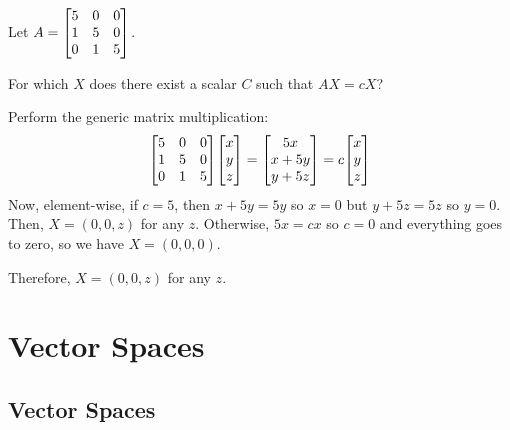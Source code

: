 \documentclass[notes]{agony}
\begin{document}
\begin{xca}
  Let $A = \mqty[5&0&0 \\ 1&5&0 \\ 0&1&5]$.

  For which $X$ does there exist a scalar $C$ such that $AX = cX$?
\end{xca}
\begin{sol}
  Perform the generic matrix multiplication:
  \[
    \mqty[5&0&0 \\ 1&5&0 \\ 0&1&5] \mqty[x \\ y \\ z]
    = \mqty[5x \\ x+5y \\ y+5z] = c\mqty[x \\ y \\ z]
  \]
  Now, element-wise, if $c = 5$, then $x+5y=5y$ so $x=0$ but $y+5z=5z$ so $y=0$.
  Then, $X = (0,0,z)$ for any $z$.
  Otherwise, $5x = cx$ so $c=0$ and everything goes to zero, so we have $X=(0,0,0)$.

  Therefore, $X = (0,0,z)$ for any $z$.
\end{sol}


\chapter{Vector Spaces}

\section{Vector Spaces}
\end{document}
